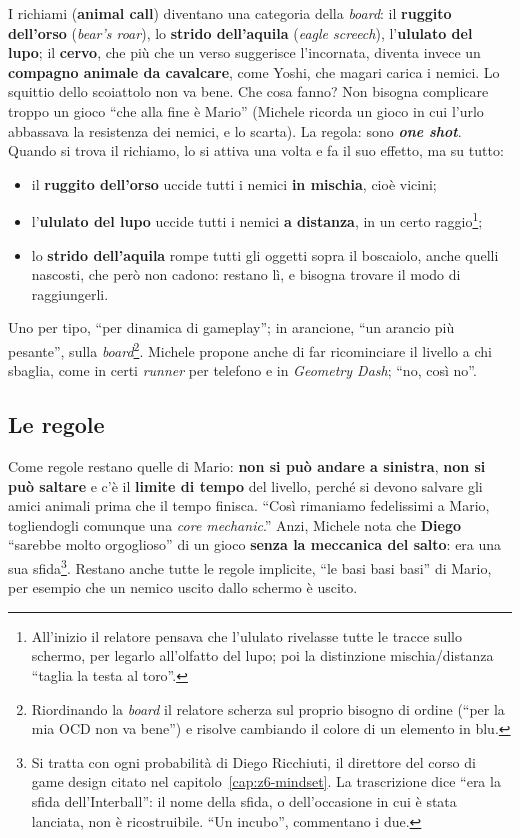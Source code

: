 I richiami (\textbf{animal call}) diventano una categoria della \emph{board}: il
\textbf{ruggito dell'orso} (\emph{bear's roar}), lo \textbf{strido dell'aquila}
(\emph{eagle screech}), l'\textbf{ululato del lupo}; il \textbf{cervo}, che più che
un verso suggerisce l'incornata, diventa invece un \textbf{compagno animale da
cavalcare}, come Yoshi, che magari carica i nemici. Lo squittio dello scoiattolo
non va bene. Che cosa fanno? Non bisogna complicare troppo un gioco ``che alla fine
è Mario'' (Michele ricorda un gioco in cui l'urlo abbassava la resistenza dei
nemici, e lo scarta). La regola: sono \textbf{\emph{one shot}}. Quando si trova il
richiamo, lo si attiva una volta e fa il suo effetto, ma su tutto:
\begin{itemize}
  \item il \textbf{ruggito dell'orso} uccide tutti i nemici \textbf{in mischia},
        cioè vicini;
  \item l'\textbf{ululato del lupo} uccide tutti i nemici \textbf{a distanza}, in
        un certo raggio\footnote{All'inizio il relatore pensava che l'ululato
        rivelasse tutte le tracce sullo schermo, per legarlo all'olfatto del lupo;
        poi la distinzione mischia/distanza ``taglia la testa al toro''.};
  \item lo \textbf{strido dell'aquila} rompe tutti gli oggetti sopra il
        boscaiolo, anche quelli nascosti, che però non cadono: restano lì, e
        bisogna trovare il modo di raggiungerli.
\end{itemize}
Uno per tipo, ``per dinamica di gameplay''; in arancione, ``un arancio più
pesante'', sulla \emph{board}\footnote{Riordinando la \emph{board} il relatore scherza
sul proprio bisogno di ordine (``per la mia OCD non va bene'') e risolve
cambiando il colore di un elemento in blu.}. Michele propone anche di far
ricominciare il livello a chi sbaglia, come in certi \emph{runner} per telefono e in
\emph{Geometry Dash}; ``no, così no''.

\subsection{Le regole}

Come regole restano quelle di Mario: \textbf{non si può andare a sinistra},
\textbf{non si può saltare} e c'è il \textbf{limite di tempo} del livello, perché
si devono salvare gli amici animali prima che il tempo finisca. ``Così rimaniamo
fedelissimi a Mario, togliendogli comunque una \emph{core mechanic}.'' Anzi, Michele
nota che \textbf{Diego} ``sarebbe molto orgoglioso'' di un gioco \textbf{senza la
meccanica del salto}: era una sua sfida\footnote{Si tratta con ogni probabilità di
Diego Ricchiuti, il direttore del corso di game design citato nel
capitolo~\ref{cap:z6-mindset}. La trascrizione dice ``era la sfida
dell'Interball'': il nome della sfida, o dell'occasione in cui è stata lanciata, non
è ricostruibile. ``Un incubo'', commentano i due.}. Restano anche tutte le regole
implicite, ``le basi basi basi'' di Mario, per esempio che un nemico uscito dallo
schermo è uscito.

